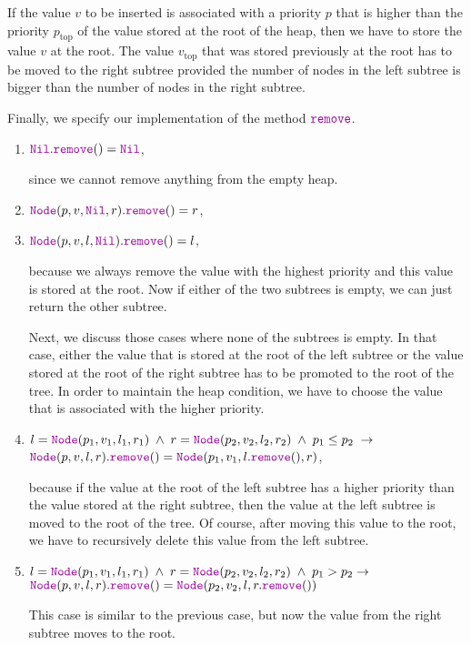 \begin{enumerate}
      If the value $v$ to be inserted is associated with a priority $p$ that is higher than the priority
      $p_{\mathrm{top}}$ of
      the value stored at the root of the heap, then we have to store the value $v$ at the root.
      The value $v_\mathrm{top}$ that was stored previously at the root has to be moved to 
      the right subtree provided the number of nodes in the left subtree is bigger than
      the number of nodes in the right subtree.
\end{enumerate}
Finally, we specify our implementation of the method $\mytt{remove}$.
\begin{enumerate}
\item $\mytt{Nil}.\mytt{remove}() = \mytt{Nil}$,

      since we cannot remove anything from the empty heap.
\item $\mytt{Node}(p,v,\mytt{Nil},r).\mytt{remove}() = r$,
  
\item $\mytt{Node}(p,v,l,\mytt{Nil}).\mytt{remove}() = l$,

      because we always remove the value with the highest priority and this value is stored at the
      root.  Now if either of the two subtrees is empty, we can just return the other subtree.

      Next, we discuss those cases where none of the subtrees is empty.
      In that case, either the value that is stored at the root of the left subtree or the value
      stored at the root of the right subtree has to be promoted to the root of the tree.
      In order to maintain the heap condition, we have to choose the value that is associated with the
      higher priority.
\item $l = \mytt{Node}(p_1,v_1,l_1,r_1) \;\wedge\; r = \mytt{Node}(p_2,v_2,l_2,r_2) \;\wedge\; p_1 \leq p_2 \;\rightarrow$ \\[0.1cm] 
      \hspace*{1.3cm} 
      $\mytt{Node}(p,v,l,r).\mytt{remove}() =      \mytt{Node}(p_1,v_1,l.\mytt{remove}(),r)$,

      because if the value at the root of the left subtree has a higher priority than the value
      stored at the right subtree, then the value at the left subtree is moved to the root of the tree.
      Of course, after moving this value to the root, we have to recursively delete this value from
      the left subtree.
\item $l = \mytt{Node}(p_1,v_1,l_1,r_1) \;\wedge\; r = \mytt{Node}(p_2,v_2,l_2,r_2) \;\wedge\; p_1 > p_2 \rightarrow$ \\[0.1cm]
      \hspace*{1.3cm} 
      $\mytt{Node}(p,v,l,r).\mytt{remove}() = \mytt{Node}(p_2,v_2,l,r.\mytt{remove}())$

      This case is similar to the previous case, but now the value from the right subtree moves to
      the root.
\end{enumerate}
